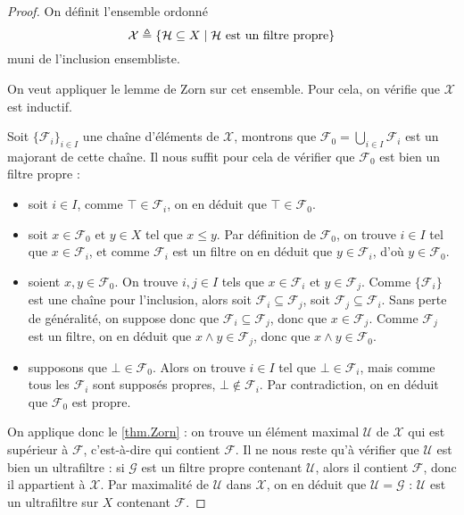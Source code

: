 \begin{proof}
  On définit l'ensemble ordonné
  \[\mathcal X \triangleq \{\mathcal H \subseteq X\mid \mathcal H
  \text{ est un filtre propre}\}\]
  muni de l'inclusion ensembliste.

  On veut appliquer le lemme de Zorn sur cet ensemble. Pour cela, on vérifie
  que $\mathcal X$ est inductif.

  Soit $\{\mathcal F_i\}_{i\in I}$ une chaîne d'éléments de $\mathcal X$, montrons
  que $\mathcal F_0 = \displaystyle\bigcup_{i\in I} \mathcal F_i$ est un majorant
  de cette chaîne. Il nous suffit pour cela de vérifier que $\mathcal F_0$ est
  bien un filtre propre :
  \begin{itemize}
  \item soit $i\in I$, comme $\top \in \mathcal F_i$, on en déduit que
    $\top \in \mathcal F_0$.
  \item soit $x\in \mathcal F_0$ et $y\in X$ tel que $x\leq y$. Par définition
    de $\mathcal F_0$, on trouve $i\in I$ tel que $x\in \mathcal F_i$, et comme
    $\mathcal F_i$ est un filtre on en déduit que $y\in \mathcal F_i$, d'où
    $y\in\mathcal F_0$.
  \item soient $x,y\in \mathcal F_0$. On trouve $i,j\in I$ tels que
    $x\in \mathcal F_i$ et $y\in \mathcal F_j$. Comme $\{\mathcal F_i\}$ est une
    chaîne pour l'inclusion, alors soit $\mathcal F_i \subseteq \mathcal F_j$,
    soit $\mathcal F_j\subseteq \mathcal F_i$. Sans perte de généralité, on
    suppose donc que $\mathcal F_i\subseteq \mathcal F_j$, donc que
    $x\in \mathcal F_j$. Comme $\mathcal F_j$ est un filtre, on en déduit que
    $x\land y \in \mathcal F_j$, donc que $x\land y \in \mathcal F_0$.
  \item supposons que $\bot\in \mathcal F_0$. Alors on trouve $i\in I$ tel que
    $\bot\in \mathcal F_i$, mais comme tous les $\mathcal F_i$ sont supposés
    propres, $\bot\notin\mathcal F_i$. Par contradiction, on en déduit que
    $\mathcal F_0$ est propre.
  \end{itemize}

  On applique donc le \cref{thm.Zorn} : on trouve un élément maximal
  $\mathcal U$ de $\mathcal X$ qui est supérieur à $\mathcal F$, c'est-à-dire
  qui contient $\mathcal F$. Il ne nous reste qu'à vérifier que $\mathcal U$ est
  bien un ultrafiltre : si $\mathcal G$ est un filtre propre contenant
  $\mathcal U$, alors il contient $\mathcal F$, donc il appartient à
  $\mathcal X$. Par maximalité de $\mathcal U$ dans $\mathcal X$, on en déduit
  que $\mathcal U = \mathcal G$ : $\mathcal U$ est un ultrafiltre sur $X$
  contenant $\mathcal F$.
\end{proof}

